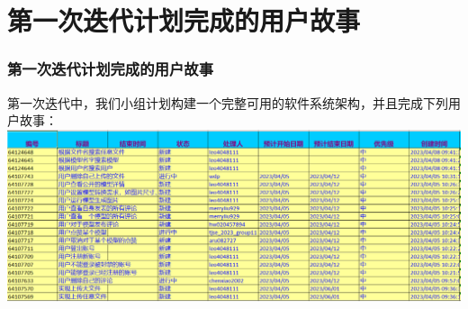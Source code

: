 \section{第一次迭代计划完成的用户故事}
\begin{frame}
    \frametitle{第一次迭代计划完成的用户故事}
    第一次迭代中，我们小组计划构建一个完整可用的软件系统架构，并且完成下列用户故事：
    \includegraphics[width=2\textwidth]{contents/figure/iteration1_stories.png}
\end{frame}